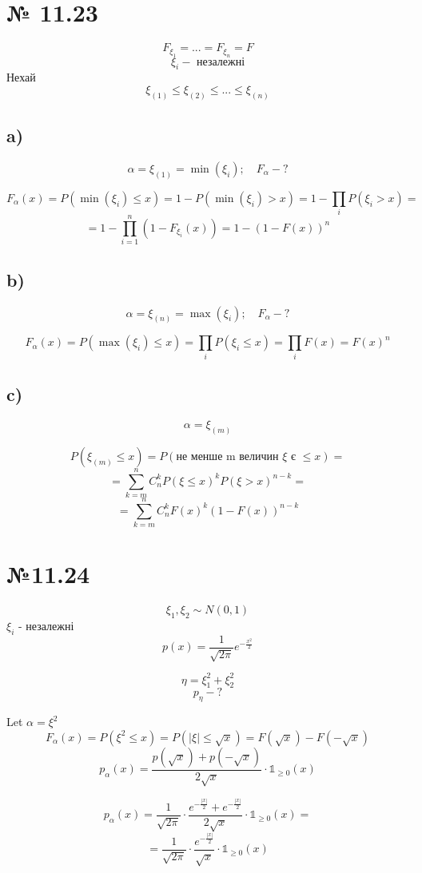 \documentclass[11pt, a4paper]{article} %
\begin{document}
\section*{№ 11.23}
\begin{mdframed}
    $$F_{\xi_1} = ... = F_{\xi_n} = F$$
    $$\xi_i - \text{ незалежні}$$
    Нехай 
    $$\xi_{(1)} \le \xi_{(2)} \le ... \le \xi_{(n)}$$
\end{mdframed}

\subsection*{a)}
$$\alpha = \xi_{(1)} = \min(\xi_i); \quad F_{\alpha} - ?$$

$$F_\alpha(x) = P(\min(\xi_i) \le x) = 1 - P(\min(\xi_i) > x) = 1 - \prod_i P(\xi_i > x) =$$
$$= 1 - \prod_{i=1}^n (1-F_{\xi_i}(x)) = 1 - (1-F(x))^n $$


\subsection*{b)}
$$\alpha = \xi_{(n)} = \max(\xi_i); \quad F_{\alpha} - ?$$

$$F_\alpha(x) = P(\max(\xi_i) \le x) = \prod_i P(\xi_i \le x) = \prod_i F(x) = F(x)^n$$

\subsection*{c)}
$$\alpha = \xi_{(m)}$$

$$P(\xi_{(m)} \le x) = P(\text{не менше m величин $\xi$ є $\le x$}) = $$
$$= \sum_{k=m}^n C_n^k P(\xi \le x)^k P(\xi > x)^{n-k} = $$
$$= \sum_{k=m}^n C_n^k F(x)^k (1-F(x))^{n-k}$$
\pagebreak

\section*{№11.24}
\begin{mdframed}
    $$\xi_1, \xi_2 \sim N(0,1)$$
    $\xi_i$ - незалежні
    $$p(x) = \frac{1}{\sqrt{2 \pi}} e^{-\frac{x^2}{2}}$$

    $$\eta = \xi_1^2 + \xi_2^2$$
    $$p_\eta - ?$$
\end{mdframed}

Let $\alpha = \xi^2$
$$F_\alpha(x) = P(\xi^2 \le x) = P(|\xi| \le \sqrt{x}) = F(\sqrt{x}) - F(-\sqrt{x})$$
$$p_\alpha(x) = \frac{p(\sqrt x) + p(-\sqrt x)}{2\sqrt{x}} \cdot \mathbb{1}_{\ge 0}(x)$$

$$p_\alpha(x) = \frac{1}{\sqrt{2 \pi}} \cdot \frac{e^{-\frac{|x|}{2}} + e^{-\frac{|x|}{2}}}{2\sqrt{x}} \cdot \mathbb{1}_{\ge 0}(x) = $$
$$= \frac{1}{\sqrt{2 \pi}} \cdot \frac{e^{-\frac{|x|}{2}}}{\sqrt{x}} \cdot \mathbb{1}_{\ge 0}(x)$$
\end{document}
